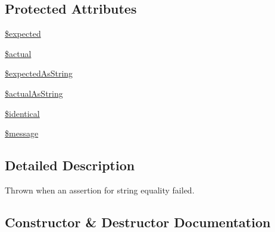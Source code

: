 \subsection*{Protected Attributes}
\begin{DoxyCompactItemize}
\item 
\mbox{\hyperlink{class_sebastian_bergmann_1_1_comparator_1_1_comparison_failure_ac6ebb6aa383a61fd33394e338e934186}{\$expected}}
\item 
\mbox{\hyperlink{class_sebastian_bergmann_1_1_comparator_1_1_comparison_failure_ae22570f5bd8df561692b7b0ef5ae1054}{\$actual}}
\item 
\mbox{\hyperlink{class_sebastian_bergmann_1_1_comparator_1_1_comparison_failure_ad06d5dd21d05d7dc04dfc372704a7928}{\$expected\+As\+String}}
\item 
\mbox{\hyperlink{class_sebastian_bergmann_1_1_comparator_1_1_comparison_failure_ae2aefb72fd2256baf9b3f9c3eb14fb6f}{\$actual\+As\+String}}
\item 
\mbox{\hyperlink{class_sebastian_bergmann_1_1_comparator_1_1_comparison_failure_aa23368b5abd6143a2a7ce100269720bb}{\$identical}}
\item 
\mbox{\hyperlink{class_sebastian_bergmann_1_1_comparator_1_1_comparison_failure_abf17cb2dba2ed17cb28aa5f37deb5293}{\$message}}
\end{DoxyCompactItemize}


\subsection{Detailed Description}
Thrown when an assertion for string equality failed. 

\subsection{Constructor \& Destructor Documentation}
\mbox{\label{class_sebastian_bergmann_1_1_comparator_1_1_comparison_failure_aa44a2a8cd15cf8a931e0c7b57f21c9af}} 
